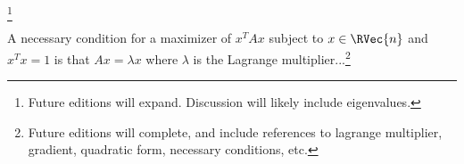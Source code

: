 
\footnote{Future editions will expand. Discussion will likely include eigenvalues.}


\begin{proposition}
  A necessary condition for a maximizer of $x^TAx$ subject to $x \in \RVec{n}$ and $x^Tx = 1$ is that $Ax = \lambda x$ where $\lambda$ is the Lagrange multiplier...\footnote{Future editions will complete, and include references to lagrange multiplier, gradient, quadratic form, necessary conditions, etc.}
\end{proposition}
